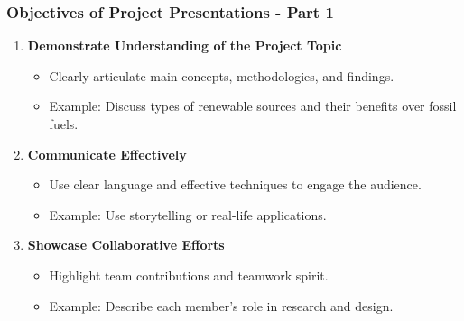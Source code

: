 \documentclass[aspectratio=169]{beamer}
\begin{document}
\begin{frame}[fragile]
    \frametitle{Objectives of Project Presentations - Part 1}
    \begin{enumerate}
        \item \textbf{Demonstrate Understanding of the Project Topic}
        \begin{itemize}
            \item Clearly articulate main concepts, methodologies, and findings.
            \item Example: Discuss types of renewable sources and their benefits over fossil fuels.
        \end{itemize}
        
        \item \textbf{Communicate Effectively}
        \begin{itemize}
            \item Use clear language and effective techniques to engage the audience.
            \item Example: Use storytelling or real-life applications.
        \end{itemize}
        
        \item \textbf{Showcase Collaborative Efforts}
        \begin{itemize}
            \item Highlight team contributions and teamwork spirit.
            \item Example: Describe each member's role in research and design.
        \end{itemize}
    \end{enumerate}
\end{frame}
\end{document}
